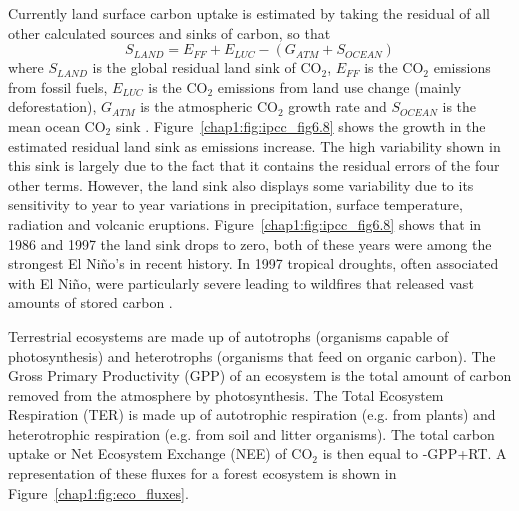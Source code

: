 Currently land surface carbon uptake is estimated by taking the residual of all other calculated sources and sinks of carbon, so that
\begin{equation}
S_{LAND} = E_{FF} + E_{LUC} - (G_{ATM} + S_{OCEAN})
\end{equation}  
where \(S_{LAND}\) is the global residual land sink of CO\(_{2}\), \(E_{FF}\) is the CO\(_{2}\) emissions from fossil fuels, \(E_{LUC}\) is the CO\(_{2}\) emissions from land use change (mainly deforestation), \(G_{ATM}\) is the atmospheric CO\(_{2}\) growth rate and \(S_{OCEAN}\) is the mean ocean CO\(_{2}\) sink \citep{le2015global}. Figure~\ref{chap1:fig:ipcc_fig6.8} shows the growth in the estimated residual land sink as emissions increase. The high variability shown in this sink is largely due to the fact that it contains the residual errors of the four other terms. However, the land sink also displays some variability due to its sensitivity to year to year variations in precipitation, surface temperature, radiation and volcanic eruptions. Figure~\ref{chap1:fig:ipcc_fig6.8} shows that in 1986 and 1997 the land sink drops to zero, both of these years were among the strongest El Ni\~no's in recent history. In 1997 tropical droughts, often associated with El Ni\~no, were particularly severe leading to wildfires that released vast amounts of stored carbon \citep{schimel2013climate}.

Terrestrial ecosystems are made up of autotrophs (organisms capable of photosynthesis) and heterotrophs (organisms that feed on organic carbon). The Gross Primary Productivity (GPP) of an ecosystem is the total amount of carbon removed from the atmosphere by photosynthesis. The Total Ecosystem Respiration (TER) is made up of autotrophic respiration (e.g. from plants) and heterotrophic respiration (e.g. from soil and litter organisms). The total carbon uptake or Net Ecosystem Exchange (NEE) of CO\(_2\) is then equal to -GPP+RT. A representation of these fluxes for a forest ecosystem is shown in Figure~\ref{chap1:fig:eco_fluxes}. 

